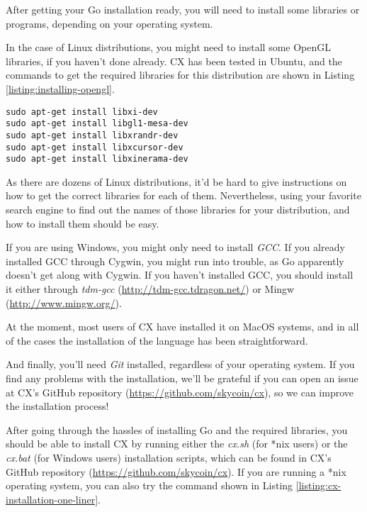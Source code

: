 \documentclass[11pt,fleqn,openany]{book} %
\begin{document}
After getting your Go installation ready, you will need to install some libraries or programs, depending on your operating system.

In the case of Linux distributions, you might need to install some OpenGL libraries, if you haven't done already. CX has been tested in Ubuntu, and the commands to get the required libraries for this distribution are shown in Listing \ref{listing:installing-opengl}.

\begin{lstlisting}[caption={Installing Required OpenGL Libraries in Ubuntu},captionpos=b,label={listing:installing-opengl}]
sudo apt-get install libxi-dev
sudo apt-get install libgl1-mesa-dev
sudo apt-get install libxrandr-dev
sudo apt-get install libxcursor-dev
sudo apt-get install libxinerama-dev
\end{lstlisting}

As there are dozens of Linux distributions, it'd be hard to give instructions on how to get the correct libraries for each of them. Nevertheless, using your favorite search engine to find out the names of those libraries for your distribution, and how to install them should be easy.

If you are using Windows, you might only need to install \emph{GCC}. If you already installed GCC through Cygwin, you might run into trouble, as Go apparently doesn't get along with Cygwin. If you haven't installed GCC, you should install it either through \emph{tdm-gcc} (\url{http://tdm-gcc.tdragon.net/}) or Mingw (\url{http://www.mingw.org/}).

At the moment, most users of CX have installed it on MacOS systems, and in all of the cases the installation of the language has been straightforward.

And finally, you'll need \emph{Git} installed, regardless of your operating system. If you find any problems with the installation, we'll be grateful if you can open an issue at CX's GitHub repository (\url{https://github.com/skycoin/cx}), so we can improve the installation process!

After going through the hassles of installing Go and the required libraries, you should be able to install CX by running either the \emph{cx.sh} (for *nix users) or the \emph{cx.bat} (for Windows users) installation scripts, which can be found in CX's GitHub repository (\url{https://github.com/skycoin/cx}). If you are running a *nix operating system, you can also try the command shown in Listing \ref{listing:cx-installation-one-liner}.
\end{document}
